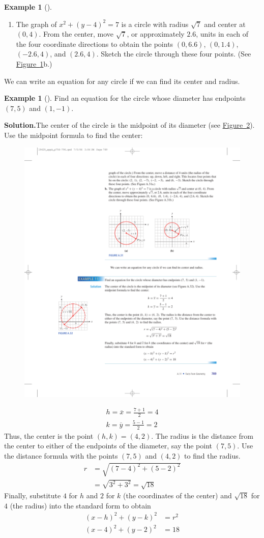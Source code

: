 \documentclass[10pt,]{book}
\theoremstyle{plain}
\theoremstyle{definition}
\theoremstyle{definition}
\newtheorem{example}[theorem]{Example}
\theoremstyle{definition}
\numberwithin{equation}{part}
\newcommand{\amp}{&}
\begin{document}
\begin{example}[]
\begin{enumerate}[label=*\alph**]
\begin{figure}
\caption{\label{fig-circles2}}
\end{figure}
%
\item\hypertarget{li-381}{}The graph of \(x^2 + (y − 4)^2 = 7\) is a circle with radius \(\sqrt{7} \) and center at \((0, 4)\). From the center, move \(\sqrt{7} \), or approximately \(2.6\), units in each of the four coordinate directions to obtain the points \((0, 6.6)\), \((0, 1.4)\), \((−2.6, 4)\), and \((2.6, 4)\). Sketch the circle through these four points. (See \hyperref[fig-circles2]{Figure~\ref{fig-circles2}}b.)%
\end{enumerate}
%
\end{example}
\par
We can write an equation for any circle if we can find its center and radius.%
\begin{example}[]\label{example-89}
Find an equation for the circle whose diameter has endpoints \((7, 5)\) and \((1,−1)\).%
\par\medskip\noindent%
\textbf{Solution.}\quad The center of the circle is the midpoint of its diameter (see \hyperref[fig-circle-irrational-radius]{Figure~\ref{fig-circle-irrational-radius}}). Use the midpoint formula to find the center: \leavevmode%
\begin{figure}
\centering
\includegraphics[width=0.35\linewidth]{images/fig-circle-irrational-radius}
\caption{\label{fig-circle-irrational-radius}}
\end{figure}
%
\begin{gather*}
h = \overline{x} = \frac{7 + 1}{2}= 4
\\
k = \overline{y} = \frac{ 5 − 1}{2}= 2
\end{gather*}
Thus, the center is the point \((h, k) = (4, 2)\). The radius is the distance from the center to either of the endpoints of the diameter, say the point \((7, 5)\). Use the distance formula with the points \((7, 5)\) and \((4, 2)\) to find the radius.%
\begin{align*}
r\amp =\sqrt{(7 − 4)^2 + (5 − 2)^2}
\\
\amp = \sqrt{3^2 + 3^2}=\sqrt{18}
\end{align*}
Finally, substitute \(4\) for \(h\) and \(2\) for \(k\) (the coordinates of the center) and \(\sqrt{18} \) for \(4\) (the radius) into the standard form to obtain%
\begin{align*}
(x − h)^2 + (y − k)^2 \amp= r^2
\\
(x − 4)^2 + (y − 2)^2 \amp = 18
\end{align*}
%
\end{example}
\typeout{************************************************}
\typeout{************************************************}
\end{document}
